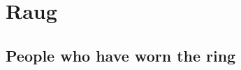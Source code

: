 \documentclass[12pt, openright, oneside, a4paper, english]{abntex2}
\begin{document}
\chapter{Raug}









%
%


\begin{apendicesenv}


\chapter{People who have worn the ring}



\end{apendicesenv}







\printindex
\end{document}
